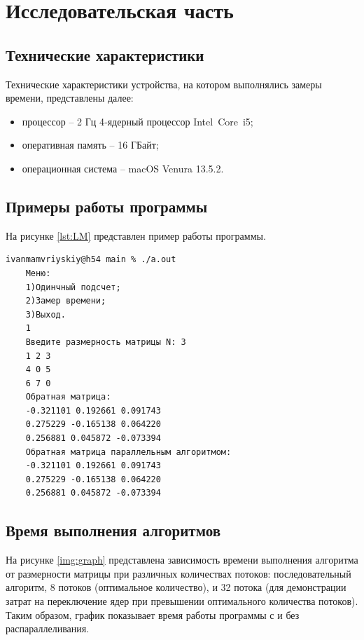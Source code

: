 \chapter{Исследовательская часть}

\section{Технические характеристики}

Технические характеристики устройства, на котором выполнялись замеры времени, представлены далее:

\begin{itemize}
	\item процессор -- 2 Гц 4‑ядерный процессор Intel Core i5;
	\item оперативная память -- 16 ГБайт;
	\item операционная система -- macOS Venura 13.5.2. 
\end{itemize}

\section{Примеры работы программы}

На рисунке \ref{lst:LM} представлен пример работы программы.

\begin{lstlisting}[label=lst:LM,caption=Пример работы программы]
	ivanmamvriyskiy@h54 main % ./a.out 
    Меню:
    1)Одинчный подсчет;
    2)Замер времени;
    3)Выход.
    1
    Введите размерность матрицы N: 3
    1 2 3
    4 0 5
    6 7 0
    Обратная матрица: 
    -0.321101 0.192661 0.091743 
    0.275229 -0.165138 0.064220 
    0.256881 0.045872 -0.073394 
    Обратная матрица параллельным алгоритмом: 
    -0.321101 0.192661 0.091743 
    0.275229 -0.165138 0.064220 
    0.256881 0.045872 -0.073394 
\end{lstlisting}

\section{Время выполнения алгоритмов}

На рисунке \ref{img:graph}  представлена зависимость времени выполнения алгоритма от размерности матрицы при различных 
количествах потоков: последовательный алгоритм, 8 потоков (оптимальное количество), и 32 потока (для демонстрации затрат на
переключение ядер при превышении оптимального количества потоков). Таким образом, график показывает время работы программы с
и без распараллеливания.

